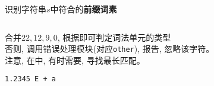 \begin{frame}{}
  \begin{center}
    识别字符串$s$中符合的{\bf 前缀词素} 
  \end{center}

  \begin{columns}
      \begin{center}
      \end{center}
      \begin{center}
      \end{center}
  \end{columns}

  \pause
  \vspace{0.30cm}
  \begin{center}
     合并$22, 12, 9, 0$, 根据即可判定词法单元的类型 \\[4pt]
    否则, 调用错误处理模块(对应\texttt{other}), 报告, 忽略该字符。 \\[4pt]
    注意, 在\scinum{}中, 有时需要, 寻找最长匹配。
  \end{center}
\end{frame}

\begin{frame}{}
  \begin{center}

    \vspace{1.00cm}

    \pause
    \vspace{0.60cm}
    \texttt{1.2345 \qquad E \qquad + \qquad a}
  \end{center}
\end{frame}
